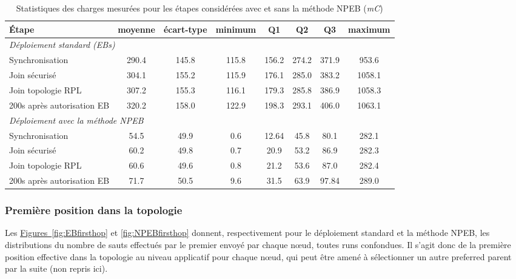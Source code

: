 \documentclass[]{report}
\newcommand{\wordlink}[2]{\hyperref[#2]{#1~\ref{#2}}}
\begin{document}
\begin{table}[h]
\centering
\begin{tabular}{|l|c|c|c|c|c|c|c|}
	\hline
    \textbf{\textbf{Étape}} & moyenne & écart-type & minimum & Q1 & Q2 & Q3 & maximum\\
    \hline
    \multicolumn{8}{|l|}{\textit{Déploiement standard (EBs)}}\\  
    \hline
    Synchronisation & 290.4 & 145.8 & 115.8 & 156.2 & 274.2 & 371.9 & 953.6\\
    \hline
    Join sécurisé & 304.1 & 155.2 & 115.9 & 176.1 & 285.0 & 383.2 & 1058.1 \\
    \hline
    Join topologie RPL & 307.2 & 155.3 & 116.1 & 179.3 & 285.8 & 386.9 & 1058.3 \\
    \hline
    200s après autorisation EB & 320.2 & 158.0 & 122.9 & 198.3 & 293.1 & 406.0 & 1063.1 \\
    \hline
    \multicolumn{8}{|l|}{\textit{Déploiement avec la méthode NPEB}}\\    
    \hline
    Synchronisation & 54.5 & 49.9 & 0.6 & 12.64 & 45.8 & 80.1 & 282.1 \\
    \hline
    Join sécurisé & 60.2 & 49.8 & 0.7 & 20.9 & 53.2 & 86.9 & 282.3 \\
    \hline
    Join topologie RPL & 60.6 & 49.6 & 0.8 & 21.2 & 53.6 & 87.0 & 282.4 \\
    \hline
    200s après autorisation EB & 71.7 & 50.5 & 9.6 & 31.5 & 63.9 & 97.84 & 289.0 \\
    \hline
\end{tabular}
\caption{Statistiques des charges mesurées pour les étapes considérées avec et sans la méthode NPEB (\textit{mC})}
\label{table_charges}
\end{table}

\subsubsection{Première position dans la topologie}
\label{results_hops}

Les \wordlink{Figures}{fig:EBfirsthop} et \ref{fig:NPEBfirsthop} donnent, respectivement pour le déploiement standard et la méthode NPEB, les distributions du nombre de sauts effectués par le premier envoyé par chaque nœud, toutes runs confondues. Il s'agit donc de la première position effective dans la topologie au niveau applicatif pour chaque nœud, qui peut être amené à sélectionner un autre preferred parent par la suite (non repris ici).
\end{document}
